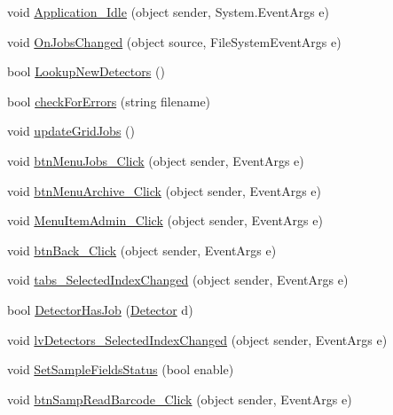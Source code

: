 \begin{DoxyCompactItemize}
\item 
void \hyperlink{class_scintilab_1_1_form_main_ab8ea1ca503bf5fecfdf241a6813fbbca}{Application\+\_\+\+Idle} (object sender, System.\+Event\+Args e)
\item 
void \hyperlink{class_scintilab_1_1_form_main_ab53847bf056f4cec151f5ad5d5e0ceec}{On\+Jobs\+Changed} (object source, File\+System\+Event\+Args e)
\item 
bool \hyperlink{class_scintilab_1_1_form_main_a158d3b89f669d3b2a24ba750caef3eec}{Lookup\+New\+Detectors} ()
\item 
bool \hyperlink{class_scintilab_1_1_form_main_a072f08bc198944051dffd3d8fac4cc9d}{check\+For\+Errors} (string filename)
\item 
void \hyperlink{class_scintilab_1_1_form_main_a26420269c1a616c31de7521deebbef5f}{update\+Grid\+Jobs} ()
\item 
void \hyperlink{class_scintilab_1_1_form_main_a9cfeb3e22a98715b97f61b779e56b260}{btn\+Menu\+Jobs\+\_\+\+Click} (object sender, Event\+Args e)
\item 
void \hyperlink{class_scintilab_1_1_form_main_a41ead05b3b898979155de24a559af523}{btn\+Menu\+Archive\+\_\+\+Click} (object sender, Event\+Args e)
\item 
void \hyperlink{class_scintilab_1_1_form_main_a2432aabab8e149c90ce3c5de9779d33a}{Menu\+Item\+Admin\+\_\+\+Click} (object sender, Event\+Args e)
\item 
void \hyperlink{class_scintilab_1_1_form_main_aca32a54e95297f770c9022441cb74a90}{btn\+Back\+\_\+\+Click} (object sender, Event\+Args e)
\item 
void \hyperlink{class_scintilab_1_1_form_main_aa8c918f5dc9b6c05a02109bf41eec156}{tabs\+\_\+\+Selected\+Index\+Changed} (object sender, Event\+Args e)
\item 
bool \hyperlink{class_scintilab_1_1_form_main_a0fc122d41cfd2269400517c27dfb2aa3}{Detector\+Has\+Job} (\hyperlink{class_scintilab_1_1_detector}{Detector} d)
\item 
void \hyperlink{class_scintilab_1_1_form_main_a4793aee20cbfead78e08f36997b9837c}{lv\+Detectors\+\_\+\+Selected\+Index\+Changed} (object sender, Event\+Args e)
\item 
void \hyperlink{class_scintilab_1_1_form_main_ad85e690e8d5fa96cbf9c0a7632bd7140}{Set\+Sample\+Fields\+Status} (bool enable)
\item 
void \hyperlink{class_scintilab_1_1_form_main_a566e7914e95ee64d886ef430796b9f64}{btn\+Samp\+Read\+Barcode\+\_\+\+Click} (object sender, Event\+Args e)
\item 

\end{DoxyCompactItemize}
